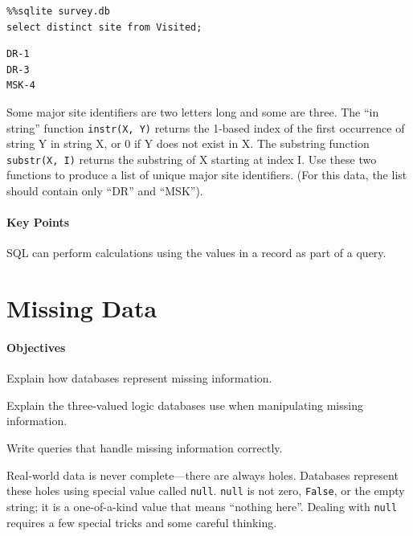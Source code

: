 \documentclass{book}
\begin{document}
\begin{verbatim}
%%sqlite survey.db
select distinct site from Visited;
\end{verbatim}

\begin{verbatim}
DR-1
DR-3
MSK-4
\end{verbatim}

Some major site identifiers are two letters long and some are three. The
``in string'' function \texttt{instr(X, Y)} returns the 1-based index of
the first occurrence of string Y in string X, or 0 if Y does not exist
in X. The substring function \texttt{substr(X, I)} returns the substring
of X starting at index I. Use these two functions to produce a list of
unique major site identifiers. (For this data, the list should contain
only ``DR'' and ``MSK'').

\mbox{}\paragraph{Key Points}

\begin{swcitemize}
\item
  SQL can perform calculations using the values in a record as part of a
  query.
\end{swcitemize}

\section{Missing Data}

\mbox{}\paragraph{Objectives}

\begin{swcitemize}
\item
  Explain how databases represent missing information.
\item
  Explain the three-valued logic databases use when manipulating missing
  information.
\item
  Write queries that handle missing information correctly.
\end{swcitemize}

Real-world data is never complete---there are always holes. Databases
represent these holes using special value called \texttt{null}.
\texttt{null} is not zero, \texttt{False}, or the empty string; it is a
one-of-a-kind value that means ``nothing here''. Dealing with
\texttt{null} requires a few special tricks and some careful thinking.
\end{document}
